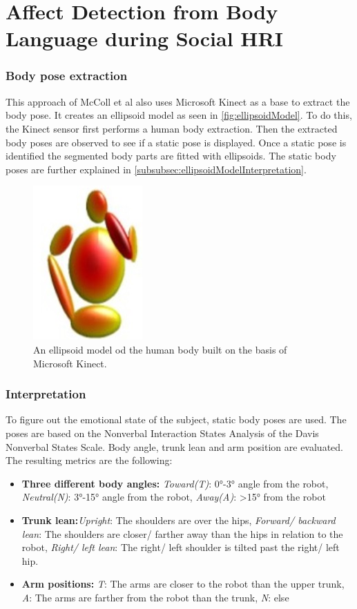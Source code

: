 \documentclass[conference]{IEEEtran}
\begin{document}
\section{Affect Detection from Body Language during Social HRI}
\subsubsection{Body pose extraction}
This approach of McColl et al\cite{mccoll2012affect} also uses Microsoft Kinect as a base to extract the body pose. It creates an ellipsoid model as seen in \autoref{fig:ellipsoidModel}. To do this, the Kinect sensor first performs a human body extraction. Then the extracted body poses are observed to see if a static pose is displayed. Once a static pose is identified the segmented body parts are fitted with ellipsoids\cite{mccoll2012affect}. The static body poses are further explained in \autoref{subsubsec:ellipsoidModelInterpretation}.

\begin{figure}[H]
\centering
\includegraphics[scale=0.5]{ellipsoidModel.jpg}
\caption{An ellipsoid model od the human body built on the basis of Microsoft Kinect.\cite{singh2015edbl}}
\label{fig:ellipsoidModel}
\end{figure}

\subsubsection{Interpretation} 
\label{subsubsec:ellipsoidModelInterpretation}
To figure out the emotional state of the subject, static body poses are used. The poses are based on the Nonverbal Interaction States Analysis of the Davis Nonverbal States Scale\cite{davis1994nonverbal}. Body angle, trunk lean and arm position are evaluated. The resulting metrics are the following: 
\begin{itemize}
\item{\textbf{Three different body angles:} \emph{Toward(T)}: 0°-3° angle from the robot, \emph{Neutral(N)}: 3°-15° angle from the robot, \emph{Away(A)}: >15° from the robot}
\item{\textbf{Trunk lean:}\emph{Upright}: The shoulders are over the hips, \emph{Forward/ backward lean}: The shoulders are closer/ farther away than the hips in relation to the robot, \emph{Right/ left lean}: The right/ left shoulder is tilted past the right/ left hip.}
\item{\textbf{Arm positions:} \emph{T}: The arms are closer to the robot than the upper trunk, \emph{A}: The arms are farther from the robot than the trunk, \emph{N}: else}
\end{itemize}
\end{document}
